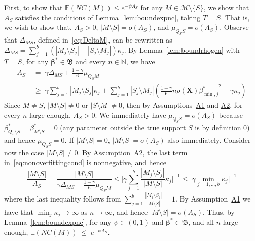 \documentclass[
  12pt]{article}
\newcommand{\E}{\mathbb{E}}
\newcommand{\N}{\mathbb{N}}
\newcommand{\bbeta}{\boldsymbol{\beta}}
\newcommand{\bX}{\mathbf{X}}
\newcommand{\bB}{\mathfrak{B}}
\begin{document}
First, to show that $\E(NC(M)) \leq e^{-\psi A_S}$
for any $M\in\mathcal{M}\setminus \{S\}$, we show that $A_S$ satisfies the conditions of Lemma~\ref{lem:boundexpnc}, taking $T=S$. 
That is, we wish to show that, $A_S>0$, $|M\setminus S|=o(A_S)$, and $\mu_{Q_S S}=o(A_S)$. 
Observe that $\Delta_{MS}$, defined in~\eqref{eq:DeltaM}, can be rewritten as $\Delta_{MS}=\sum_{j=1}^b(|M_j\setminus S_j|-|S_j\setminus M_j|)\kappa_j$. By  Lemma~\ref{lem:boundrhogen} with $T=S$, for any $\bbeta^*\in\bB$ and every $n\in \N$, we have 
\begin{equation}\label{eq:nonoverfittingcond}
\begin{aligned}
     A_S & \;=\; \gamma \Delta_{MS}+\frac{1-\gamma}{6}\mu_{Q_SM}\\
     & \;\geq\;  \gamma\sum_{j=1}^b|M_j \setminus S_j|\kappa_j + \sum_{j=1}^b |S_j\setminus M_j |\left(\tfrac{1-\gamma}{6} n \rho(\bX) {\beta^*_{\min,j}}^{2} - \gamma\kappa_j\right) 
\end{aligned}
\end{equation} 
Since $M\neq S$, $|M\setminus S|\neq0$ or $|S\setminus M|\neq0$, then by Assumptions~\hyperlink{lab:A1}{A1} and \hyperlink{lab:A2}{A2}, for every $n$ large enough, $A_S>0$. We immediately have $\mu_{Q_S S}=o(A_S)$ because $\beta^*_{Q_S\setminus S}=\beta^*_{M\setminus S}=0$ (any parameter outside the true support $S$ is by definition 0) and hence $\mu_{Q_S S}=0$.
If $|M\setminus S|=0$, $|M\setminus S|=o(A_S)$ also immediately. Consider now the case $|M\setminus S|\neq 0$. By Assumption~\hyperlink{lab:A2}{A2}, the last term in~\eqref{eq:nonoverfittingcond} is nonnegative, and hence
$$\frac{|M\setminus S|}{A_S}
= \frac{|M\setminus S|}{\gamma \Delta_{MS}+\frac{1-\gamma}{6}\mu_{Q_SM}}
\leq \bigg[ \gamma\sum_{j=1}^b\frac{|M_j \setminus S_j|}{|M\setminus S|}\kappa_j \bigg]^{-1} \leq \Big[ \gamma\min_{j=1,\ldots,b}\kappa_j \Big]^{-1} $$
where the last inequality follows from $\sum_{j=1}^b\frac{|M_j \setminus S_j|}{|M\setminus S|}=1$. By Assumption~\hyperlink{lab:A1}{A1} we have that $\min_j \kappa_j \to \infty$ as $n \rightarrow \infty$, and hence $|M\setminus S|=o(A_S)$. Thus, %
by Lemma~\ref{lem:boundexpnc}, for any $\psi\in(0,1)$ \color{green}and $\bbeta^*\in \bB$\color{black}, and all $n$ large enough,
$
\E(NC(M))\;\leq\;e^{-\psi A_S}.
$
\end{document}
